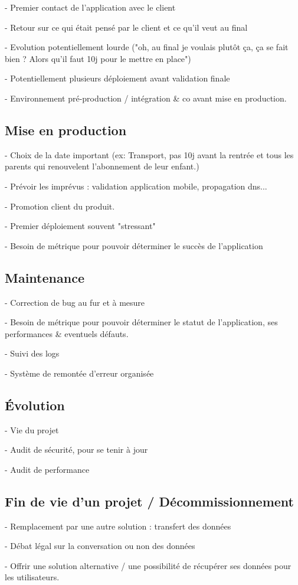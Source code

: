 - Premier contact de l'application avec le client

- Retour sur ce qui était pensé par le client et ce qu'il veut au final

- Evolution potentiellement lourde ("oh, au final je voulais plutôt ça, ça se fait bien ? Alors qu'il faut 10j pour le mettre en place")

- Potentiellement plusieurs déploiement avant validation finale

- Environnement pré-production / intégration \& co avant mise en production.


\subsection{Mise en production}

- Choix de la date important (ex: Transport, pas 10j avant la rentrée et tous les parents qui renouvelent l'abonnement de leur enfant.)

- Prévoir les imprévus : validation application mobile, propagation dns...

- Promotion client du produit.

- Premier déploiement souvent "stressant"

- Besoin de métrique pour pouvoir déterminer le succès de l'application


\subsection{Maintenance}

- Correction de bug au fur et à mesure

- Besoin de métrique pour pouvoir déterminer le statut de l'application, ses performances \& eventuels défauts.

- Suivi des logs 

- Système de remontée d'erreur organisée


\subsection{Évolution}


- Vie du projet

- Audit de sécurité, pour se tenir à jour

- Audit de performance

\subsection{Fin de vie d'un projet / Décommissionnement}


- Remplacement par une autre solution : transfert des données

- Débat légal sur la conversation ou non des données

- Offrir une solution alternative / une possibilité de récupérer ses données pour les utilisateurs.

